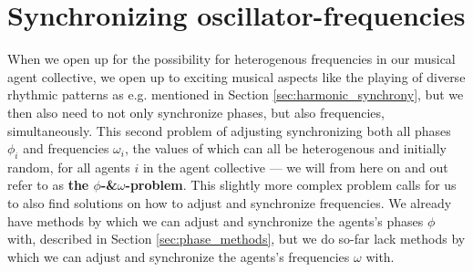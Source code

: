 	
	
	

\section{Synchronizing oscillator-frequencies}
\label{sec:frequency_methods}
	When we open up for the possibility for heterogenous frequencies in our musical agent collective, we open up to exciting musical aspects like the playing of diverse rhythmic patterns as e.g. mentioned in Section \ref{sec:harmonic_synchrony}, but we then also need to not only synchronize phases, but also frequencies, simultaneously. This second problem of adjusting synchronizing both all phases $\phi_i$ and frequencies $\omega_i$, the values of which can all be heterogenous and initially random, for all agents $i$ in the agent collective — we will from here on and out refer to as \textbf{the $\phi$-\&$\omega$-problem}. This slightly more complex problem calls for us to also find solutions on how to adjust and synchronize frequencies. We already have methods by which we can adjust and synchronize the agents's phases $\phi$ with, described in Section \ref{sec:phase_methods}, but we do so-far lack methods by which we can adjust and synchronize the agents's frequencies $\omega$ with.
	
